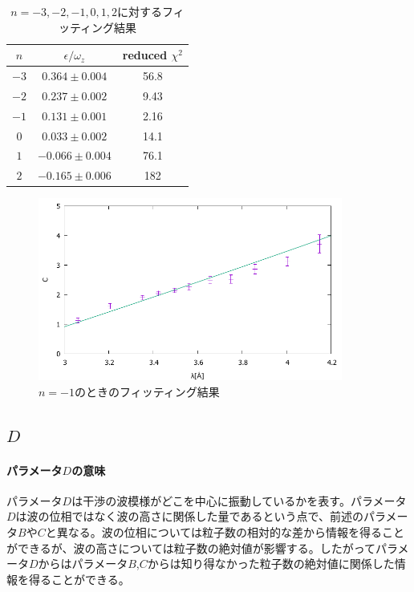 \begin{table}[H]
\centering
\caption{$n=-3,-2,-1,0,1,2$に対するフィッティング結果}\label{Discussion_tbl_Cfit}
\begin{tabular}{ccc}
$n$&$\epsilon/\omega_z$&reduced $\chi^2$\\ \hline
$-3$	&$0.364 \pm0.004$ 	&56.8 \\
$-2$	&$0.237 \pm0.002$ 	&9.43 \\
$-1$	&$0.131 \pm0.001$ 	&2.16 \\
$0$	&$0.033 \pm0.002$ 	&14.1 \\
$1$	&$-0.066 \pm0.004$ 	&76.1 \\
$2$	&$-0.165 \pm0.006$ 	&182\\ \hline
\end{tabular}
\end{table}
\begin{figure}[h]
\centering
\includegraphics[width=10cm]{discussion/C/C_F_fit.pdf}
\caption{$n=-1$のときのフィッティング結果}\label{Discussion_fig_Cfit}
\end{figure}

\subsection{$D$}
\paragraph{パラメータ$D$の意味}
パラメータ$D$は干渉の波模様がどこを中心に振動しているかを表す。パラメータ$D$は波の位相ではなく波の高さに関係した量であるという点で、前述のパラメータ$B$や$C$と異なる。波の位相については粒子数の相対的な差から情報を得ることができるが、波の高さについては粒子数の絶対値が影響する。したがってパラメータ$D$からはパラメータ$B$,$C$からは知り得なかった粒子数の絶対値に関係した情報を得ることができる。

